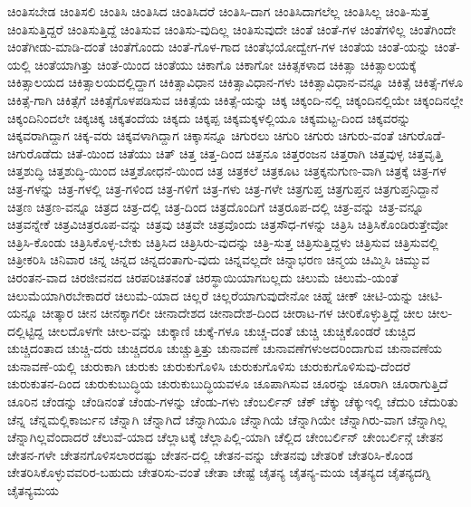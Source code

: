 {ಚಿಂತಿಸಬೇಡ
ಚಿಂತಿಸಲಿ
ಚಿಂತಿಸಿ
ಚಿಂತಿಸಿದ
ಚಿಂತಿಸಿದರೆ
ಚಿಂತಿಸಿ-ದಾಗ
ಚಿಂತಿಸಿದಾಗಲೆಲ್ಲ
ಚಿಂತಿಸಿಲ್ಲ
ಚಿಂತಿ-ಸುತ್ತ
ಚಿಂತಿಸುತ್ತಿದ್ದರೆ
ಚಿಂತಿಸುತ್ತಿದ್ದೆ
ಚಿಂತಿಸುವ
ಚಿಂತಿಸು-ವುದಿಲ್ಲ
ಚಿಂತಿಸುವುದೇ
ಚಿಂತೆ
ಚಿಂತೆ-ಗಳ
ಚಿಂತೆಗಳಿಲ್ಲ
ಚಿಂತೆಗಿಂದೇ
ಚಿಂತೆಗೀಡು-ಮಾಡಿ-ದಂತೆ
ಚಿಂತೆಗೊಂದು
ಚಿಂತೆ-ಗೊಳ-ಗಾದ
ಚಿಂತೆಭಯೋದ್ವೇಗ-ಗಳ
ಚಿಂತೆಯ
ಚಿಂತೆ-ಯನ್ನು
ಚಿಂತೆ-ಯಲ್ಲಿ
ಚಿಂತೆಯಾಗಿತ್ತು
ಚಿಂತೆ-ಯಿಂದ
ಚಿಂತೆಯು
ಚಿಕಾಗೊ
ಚಿಕಾಗೋ
ಚಿಕಿತ್ಸಕಳಾದ
ಚಿಕಿತ್ಸಾ
ಚಿಕಿತ್ಸಾಲಯಕ್ಕೆ
ಚಿಕಿತ್ಸಾಲಯದ
ಚಿಕಿತ್ಸಾಲಯದಲ್ಲಿದ್ದಾಗ
ಚಿಕಿತ್ಸಾವಿಧಾನ
ಚಿಕಿತ್ಸಾವಿಧಾನ-ಗಳು
ಚಿಕಿತ್ಸಾವಿಧಾನ-ವನ್ನೂ
ಚಿಕಿತ್ಸೆ
ಚಿಕಿತ್ಸೆ-ಗಳೂ
ಚಿಕಿತ್ಸೆ-ಗಾಗಿ
ಚಿಕಿತ್ಸೆಗೆ
ಚಿಕಿತ್ಸೆಗೊಳಪಡಿಸುವ
ಚಿಕಿತ್ಸೆಯ
ಚಿಕಿತ್ಸೆ-ಯನ್ನು
ಚಿಕ್ಕ
ಚಿಕ್ಕಂದಿ-ನಲ್ಲಿ
ಚಿಕ್ಕಂದಿನಲ್ಲಿಯೇ
ಚಿಕ್ಕಂದಿನಲ್ಲೇ
ಚಿಕ್ಕಂದಿನಿಂದಲೇ
ಚಿಕ್ಕಚಿಕ್ಕ
ಚಿಕ್ಕತಂದೆಯ
ಚಿಕ್ಕದು
ಚಿಕ್ಕಪ್ಪ
ಚಿಕ್ಕಮಕ್ಕಳಲ್ಲಿಯೂ
ಚಿಕ್ಕಮಟ್ಟ-ದಿಂದ
ಚಿಕ್ಕವರನ್ನು
ಚಿಕ್ಕವರಾಗಿದ್ದಾಗ
ಚಿಕ್ಕ-ವರು
ಚಿಕ್ಕವಳಾಗಿದ್ದಾಗ
ಚಿಕ್ಕಾಸನ್ನೂ
ಚಿಗುರಲು
ಚಿಗುರಿ
ಚಿಗುರು
ಚಿಗುರು-ವಂತೆ
ಚಿಗುರೊಡೆ-
ಚಿಗುರೊಡೆದು
ಚಿತೆ-ಯಿಂದ
ಚಿತೆಯು
ಚಿತ್
ಚಿತ್ತ
ಚಿತ್ತ-ದಿಂದ
ಚಿತ್ತನೂ
ಚಿತ್ತರಂಜನ
ಚಿತ್ತರಾಗಿ
ಚಿತ್ತವುಳ್ಳ
ಚಿತ್ತವೃತ್ತಿ
ಚಿತ್ತಶುದ್ಧಿ
ಚಿತ್ತಶುದ್ಧಿ-ಯಿಂದ
ಚಿತ್ತಶೋಧನೆ-ಯಿಂದ
ಚಿತ್ರ
ಚಿತ್ರಕಲೆ
ಚಿತ್ರಕೂಟ
ಚಿತ್ರಕ್ಕನುಗುಣ-ವಾಗಿ
ಚಿತ್ರಕ್ಕೆ
ಚಿತ್ರ-ಗಳ
ಚಿತ್ರ-ಗಳನ್ನು
ಚಿತ್ರ-ಗಳಲ್ಲಿ
ಚಿತ್ರ-ಗಳಿಂದ
ಚಿತ್ರ-ಗಳಿಗೆ
ಚಿತ್ರ-ಗಳು
ಚಿತ್ರ-ಗಳೇ
ಚಿತ್ರಗುಪ್ತ
ಚಿತ್ರಗುಪ್ತನ
ಚಿತ್ರಗುಪ್ತನಿದ್ದಾನೆ
ಚಿತ್ರಣ
ಚಿತ್ರಣ-ವನ್ನೂ
ಚಿತ್ರದ
ಚಿತ್ರ-ದಲ್ಲಿ
ಚಿತ್ರ-ದಿಂದ
ಚಿತ್ರದೊಂದಿಗೆ
ಚಿತ್ರರೂಪ-ದಲ್ಲಿ
ಚಿತ್ರ-ವನ್ನು
ಚಿತ್ರ-ವನ್ನೂ
ಚಿತ್ರವನ್ನೇಕೆ
ಚಿತ್ರವಿಚಿತ್ರರೂಪ-ವನ್ನು
ಚಿತ್ರವು
ಚಿತ್ರವೇ
ಚಿತ್ರವೊಂದು
ಚಿತ್ರಸೌಧ-ಗಳನ್ನು
ಚಿತ್ರಿಸಿ
ಚಿತ್ರಿಸಿಕೊಂಡಿರುತ್ತೇವೋ
ಚಿತ್ರಿಸಿ-ಕೊಂಡು
ಚಿತ್ರಿಸಿಕೊಳ್ಳ-ಬೇಕು
ಚಿತ್ರಿಸಿದ
ಚಿತ್ರಿಸಿರು-ವುದನ್ನು
ಚಿತ್ರಿ-ಸುತ್ತ
ಚಿತ್ರಿಸುತ್ತಿದ್ದಳು
ಚಿತ್ರಿಸುವ
ಚಿತ್ರಿಸುವಲ್ಲಿ
ಚಿತ್ರೀಕರಿಸಿ
ಚಿನಿವಾರ
ಚಿನ್ನ
ಚಿನ್ನದ
ಚಿನ್ನದಂತಾಗು-ವುದು
ಚಿನ್ನವಲ್ಲದೇ
ಚಿನ್ನಾಭರಣ
ಚಿನ್ಮಯ
ಚಿಮ್ಮಿಸಿ
ಚಿಮ್ಮುವ
ಚಿರಂತನ-ವಾದ
ಚಿರಜೀವನದ
ಚಿರಪರಿಚಿತನಂತೆ
ಚಿರಸ್ಥಾಯಿಯಾಗಬಲ್ಲದು
ಚಿಲುಮೆ
ಚಿಲುಮೆ-ಯಂತೆ
ಚಿಲುಮೆಯಾಗಿರಬೇಕಾದರೆ
ಚಿಲುಮೆ-ಯಾದ
ಚಿಲ್ಲರೆ
ಚಿಲ್ಲರೆಯಾಗುವುದೇನೋ
ಚಿಹ್ನೆ
ಚೀಕ್
ಚೀಟಿ-ಯನ್ನು
ಚೀಟಿ-ಯನ್ನೂ
ಚೀತ್ಕಾರ
ಚೀನ
ಚೀನಕ್ಕಾಗಲೀ
ಚೀನಾದೇಶದ
ಚೀನಾದೇಶ-ದಿಂದ
ಚೀರಾಟ-ಗಳ
ಚೀರಿಕೊಳ್ಳುತ್ತಿದ್ದೆ
ಚೀಲ
ಚೀಲ-ದಲ್ಲಿಟ್ಟಿದ್ದ
ಚೀಲದೊಳಗೇ
ಚೀಲ-ವನ್ನು
ಚುಕ್ಕಾಣಿ
ಚುಕ್ಕೆ-ಗಳೂ
ಚುಚ್ಚ-ದಂತೆ
ಚುಚ್ಚಿ
ಚುಚ್ಚಿಕೊಂಡರೆ
ಚುಚ್ಚಿದ
ಚುಚ್ಚಿದಂತಾದ
ಚುಚ್ಚಿ-ದರು
ಚುಚ್ಚಿದರೂ
ಚುಚ್ಚುತ್ತಿತ್ತು
ಚುನಾವಣೆ
ಚುನಾವಣೆಗಳುಅದರಿಂದಾಗುವ
ಚುನಾವಣೆಯ
ಚುನಾವಣೆ-ಯಲ್ಲಿ
ಚುರುಕಾಗಿ
ಚುರುಕು
ಚುರುಕುಗೊಳಿಸಿ
ಚುರುಕುಗೊಳಿಸು
ಚುರುಕುಗೊಳಿಸುವು-ದೆಂದರೆ
ಚುರುಕುತನ-ದಿಂದ
ಚುರುಕುಬುದ್ಧಿಯ
ಚುರುಕುಬುದ್ಧಿಯವಳೂ
ಚೂಪಾಗಿಸುವ
ಚೂರನ್ನು
ಚೂರಾಗಿ
ಚೂರಾಗುತ್ತಿದೆ
ಚೂರಿನ
ಚೆಂಡನ್ನು
ಚೆಂಡಿನಂತೆ
ಚೆಂಡು-ಗಳನ್ನು
ಚೆಂಡು-ಗಳು
ಚೆಂಬರ್ಲಿನ್
ಚೆಕ್
ಚೆಕ್ಕು
ಚೆಕ್ಕುಇಲ್ಲಿ
ಚೆದುರಿ
ಚೆದುರಿತು
ಚೆನ್ನ
ಚೆನ್ನಮಲ್ಲಿಕಾರ್ಜುನ
ಚೆನ್ನಾಗಿ
ಚೆನ್ನಾಗಿದೆ
ಚೆನ್ನಾಗಿಯೂ
ಚೆನ್ನಾಗಿಯೆ
ಚೆನ್ನಾಗಿಯೇ
ಚೆನ್ನಾಗಿರು-ವಾಗ
ಚೆನ್ನಾಗಿಲ್ಲ
ಚೆನ್ನಾಗಿಲ್ಲವೆಂದಾದರೆ
ಚೆಲುವೆ-ಯಾದ
ಚೆಲ್ಲಾಟಕ್ಕೆ
ಚೆಲ್ಲಾಪಿಲ್ಲಿ-ಯಾಗಿ
ಚೆಲ್ಲಿದ
ಚೇಂಬರ್ಲಿನ್
ಚೇಂಬರ್ಲಿನ್ಗೆ
ಚೇತನ
ಚೇತನ-ಗಳೇ
ಚೇತನಗೊಳಿಸಲಾರದಷ್ಟು
ಚೇತನ-ದಲ್ಲಿ
ಚೇತನ-ವನ್ನು
ಚೇತನವು
ಚೇತರಿಕೆ
ಚೇತರಿಸಿ-ಕೊಂಡ
ಚೇತರಿಸಿಕೊಳ್ಳುವವರಿರ-ಬಹುದು
ಚೇತರಿಸು-ವಂತೆ
ಚೇತಾ
ಚೇಷ್ಟೆ
ಚೈತನ್ಯ
ಚೈತನ್ಯ-ಮಯ
ಚೈತನ್ಯದ
ಚೈತನ್ಯದಗ್ನಿ
ಚೈತನ್ಯಮಯ
}
